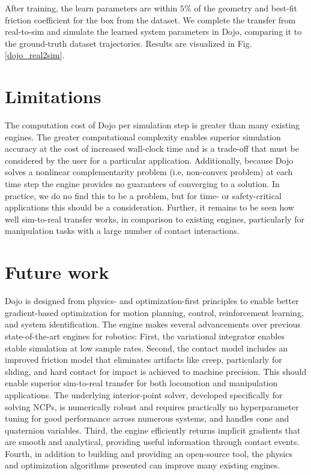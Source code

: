 After training, the learn parameters are within $5\%$ of the geometry and best-fit friction coefficient for the box from the dataset. We complete the transfer from real-to-sim and simulate the learned system parameters in Dojo, comparing it to the ground-truth dataset trajectories. Results are visualized in Fig. \ref{dojo_real2sim}.

\section{Limitations} \label{dojo_limitations}

The computation cost of Dojo per simulation step is greater than many existing engines. The greater computational complexity enables superior simulation accuracy at the cost of increased wall-clock time and is a trade-off that must be considered by the user for a particular application. Additionally, because Dojo solves a nonlinear complementarity problem (i.e, non-convex problem) at each time step the engine provides no guarantees of converging to a solution. In practice, we do no find this to be a problem, but for time- or safety-critical applications this should be a consideration. Further, it remains to be seen how well sim-to-real transfer works, in comparison to existing engines, particularly for manipulation tasks with a large number of contact interactions.

\section{Future work} \label{dojo_future_work}

Dojo is designed from physics- and optimization-first principles to enable better gradient-based optimization for motion planning, control, reinforcement learning, and system identification. The engine makes several advancements over previous state-of-the-art engines for robotics: First, the variational integrator enables stable simulation at low sample rates. Second, the contact model includes an improved friction model that eliminates artifacts like creep, particularly for sliding, and hard contact for impact is achieved to machine precision. This should enable superior sim-to-real transfer for both locomotion and manipulation applications. The underlying interior-point solver, developed specifically for solving NCPs, is numerically robust and requires practically no hyperparameter tuning for good performance across numerous systems, and handles cone and quaternion variables. Third, the engine efficiently returns implicit gradients that are smooth and analytical, providing useful information through contact events. Fourth, in addition to building and providing an open-source tool, the physics and optimization algorithms presented can improve many existing engines.

